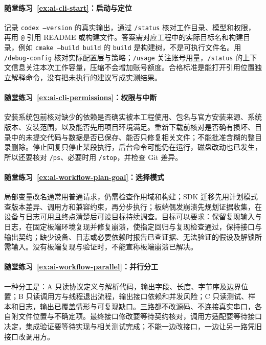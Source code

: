 \paragraph*{随堂练习~\ref{ex:ai-cli-start}：启动与定位}
\begin{solution}
记录 \texttt{codex --version} 的真实输出，通过 \texttt{/status} 核对工作目录、模型和权限，再用 \texttt{@} 引用 README 或构建文件。答案需对应工程中的实际目标名和构建目录，例如 \texttt{cmake --build build} 的 \texttt{build} 是构建树，不是可执行文件名。用 \texttt{/debug-config} 核对实际配置层与策略；\texttt{/usage} 关注账号用量，\texttt{/status} 的上下文信息关注本次工作容量，压缩不会增加账号额度。合格标准是能打开引用位置独立解释命令，没有把未执行的建议写成实测结果。
\end{solution}

\paragraph*{随堂练习~\ref{ex:ai-cli-permissions}：权限与中断}
\begin{solution}
安装系统包前核对缺少的依赖是否确实被本工程使用、包名与官方安装来源、系统版本、安装范围，以及能否先用项目环境满足。重新下载前核对是否确有损坏、目录中的未提交代码与数据是否已保存、能否只修复相关文件；不能批准含糊的整目录删除。停止回复只停止某段执行，后台命令可能仍在运行，磁盘改动也已发生，所以还要核对 \texttt{/ps}、必要时用 \texttt{/stop}，并检查 Git 差异。
\end{solution}

\paragraph*{随堂练习~\ref{ex:ai-workflow-plan-goal}：选择模式}
\begin{solution}
局部变量改名通常用普通请求，仍需检查作用域和构建；SDK 迁移先用计划模式查版本差异、调用方和兼容约束，再分步执行；板端偶发崩溃先规划证据收集，在设备与日志可用且终点清楚后可设目标持续调查。目标可以要求：保留复现输入与日志，在固定板端环境复现并修复崩溃，使指定回归与复现检查通过，保持接口与输出契约；缺少设备、日志或必要依赖时报告已查证据、无法验证的假设及解锁所需输入。没有板端复现与验证时，不能宣称板端崩溃已解决。
\end{solution}

\paragraph*{随堂练习~\ref{ex:ai-workflow-parallel}：并行分工}
\begin{solution}
一种分工是：A 只读协议定义与解析代码，输出字段、长度、字节序及边界位置；B 只读调用方与线程退出流程，输出接口依赖和并发风险；C 只读测试、样本和日志，输出已覆盖情形与可复现缺口。三路都不改源码、不连接真实串口，各自附文件位置与不确定项。最终接口修改要等待契约核对，调用方适配要等待接口决定，集成验证要等待实现与相关测试完成；不能一边改接口，一边让另一路凭旧接口改调用方。
\end{solution}

